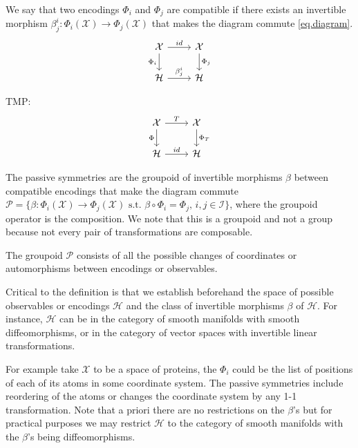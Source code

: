 \documentclass{article}
\theoremstyle{plain}
\theoremstyle{definition}
\theoremstyle{remark}
\begin{document}
We say that two encodings $\Phi_i$ and $\Phi_j$ are compatible if there exists an invertible morphism $\beta_{j}^i:\Phi_i(\mathcal X)\to  \Phi_j(\mathcal X)$ that makes the diagram commute \eqref{eq.diagram}.
\begin{equation}\label{eq.diagram}
\begin{tikzcd}[]
  {\cal X}\arrow[r,"id"] \arrow[d,"\Phi_i",swap] & {\cal X}  \arrow[d,"\Phi_j"]\\
{\mathcal H} \arrow[r,"\beta_{j}^i"]  & {\mathcal H} 
\end{tikzcd}
\end{equation}

{\tiny
TMP:
\begin{equation}\label{eq.diagram-active-passive}
\begin{tikzcd}[]
  {\cal X}\arrow[r,"T"] \arrow[d,"\Phi",swap] & {\cal X}  \arrow[d,"\Phi_T"]\\
{\mathcal H} \arrow[r,"id"] & {\mathcal H} 
\end{tikzcd}
\end{equation}
}



The passive symmetries are the groupoid of invertible morphisms $\beta$ between compatible encodings that make the diagram commute $\mathcal P = \{\beta: \Phi_i(\mathcal X) \to \Phi_j(\mathcal X) \text{ s.t. } \beta\circ \Phi_i = \Phi_j, \, i,j\in \mathcal I \}$, where the groupoid operator is the composition. We note that this is a groupoid and not a group because not every pair of transformations are composable. 

The groupoid $\mathcal P$ consists of all the possible changes of coordinates or automorphisms between encodings or observables.

Critical to the definition is that we establish beforehand the space of possible observables or encodings $\mathcal H$ and the class of invertible morphisms $\beta$ of $\mathcal H$. For instance, $\mathcal H$ can be in the category of smooth manifolds with smooth diffeomorphisms, or in the category of vector spaces with invertible linear transformations.   

For example take $\mathcal X$ to be a space of proteins, the $\Phi_i$  could be the list of positions of each of its atoms in some coordinate system. The passive symmetries include reordering of the atoms or changes the coordinate system by any 1-1 transformation. Note that a priori there are no restrictions on the $\beta$'s but for practical purposes we may restrict $\mathcal H$ to the category of smooth manifolds with the $\beta$'s being diffeomorphisms.  
\end{document}

